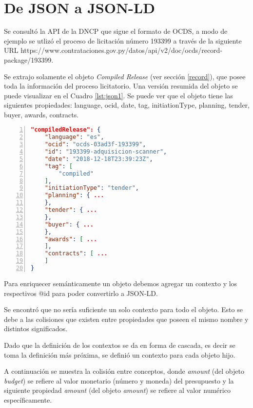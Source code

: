 \section{De JSON a JSON-LD}
\label{section:jsonajsonld}

Se consultó la API de la DNCP que sigue el formato de OCDS, a modo de ejemplo se utlizó el proceso de licitación número 193399 a través de la siguiente URL https://www.contrataciones.gov.py/datos/api/v2/doc/ocds/record-package/193399.

Se extrajo solamente el objeto \textit{Compiled Release} (ver sección \ref{record}), que posee toda la información del proceso licitatorio. Una versión resumida del objeto se puede visualizar en el Cuadro \ref{lst:json1}. Se puede ver que el objeto tiene las siguientes propiedades: language, ocid, date, tag, initiationType, planning, tender, buyer, awards, contracts.\hfill \break

\noindent\begin{minipage}{\textwidth}
\begin{lstlisting}[captionpos=b, caption=Objeto JSON del OCDS de un Compiled Release, label=lst:json1,  numbers=left, language=json, numberstyle=\tiny\color{mygray},frame=single]
"compiledRelease": {
    "language": "es",
    "ocid": "ocds-03ad3f-193399",
    "id": "193399-adquisicion-scanner",
    "date": "2018-12-18T23:39:23Z",
    "tag": [
        "compiled"
    ],
    "initiationType": "tender",
    "planning": { ...
    },
    "tender": { ...
    },
    "buyer": { ...
    },
    "awards": [ ...
    ],
    "contracts": [ ...
    ]
}
\end{lstlisting}
\end{minipage}


Para enriquecer semánticamente un objeto debemos agregar un contexto y los respectivos @id para poder convertirlo a JSON-LD. 

Se encontró que no sería suficiente un solo contexto para todo el objeto. Esto se debe a las colisiones que existen entre propiedades que poseen el mismo nombre y distintos significados.

Dado que la definición de los contextos se da en forma de cascada, es decir se toma la definición más próxima, se definió un contexto para cada objeto hijo.

A continuación se muestra la colisión entre conceptos, donde \textit{amount} (del objeto \textit{budget}) se refiere al valor monetario (número y moneda) del presupuesto y la siguiente propiedad \textit{amount} (del objeto \textit{amount}) se refiere al valor numérico específicamente.\hfill \break

